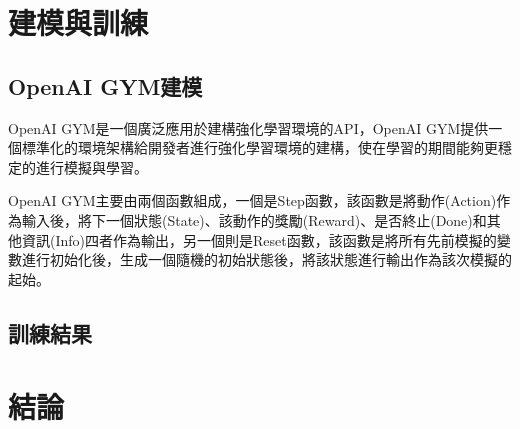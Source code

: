 \documentclass[a4paper, onecolumn, 11pt, AutoFakeBold]{article}
\newcommand{\texttwelve}{\fontsize{12}{12}\selectfont}
\begin{document}
\begin{multicols*}{2}
\smallskip
\section{建模與訓練}
\subsection{OpenAI GYM建模}
\par
OpenAI GYM是一個廣泛應用於建構強化學習環境的API，OpenAI GYM提供一個標準化的環境架構給開發者進行強化學習環境的建構，使在學習的期間能夠更穩定的進行模擬與學習。
\par
OpenAI GYM主要由兩個函數組成，一個是Step函數，該函數是將動作(Action)作為輸入後，將下一個狀態(State)、該動作的獎勵(Reward)、是否終止(Done)和其他資訊(Info)四者作為輸出，另一個則是Reset函數，該函數是將所有先前模擬的變數進行初始化後，生成一個隨機的初始狀態後，將該狀態進行輸出作為該次模擬的起始。
\par

\smallskip
\subsection{訓練結果}

\smallskip
\section{結論}

\smallskip
\titleformat{\section}{\bfseries\texttwelve}{\xCJKnumber{\thesection}、}{0em}{}
\printbibliography[title=\texttwelve{參考文獻}]

\end{multicols*}
\end{document}
